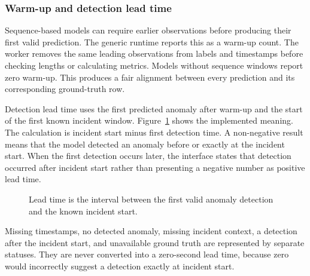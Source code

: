 \subsubsection{Warm-up and detection lead time}

Sequence-based models can require earlier observations before producing their first valid prediction. The generic runtime reports this as a warm-up count. The worker removes the same leading observations from labels and timestamps before checking lengths or calculating metrics. Models without sequence windows report zero warm-up. This produces a fair alignment between every prediction and its corresponding ground-truth row.

Detection lead time uses the first predicted anomaly after warm-up and the start of the first known incident window. Figure~\ref{fig:comparison_lead_time} shows the implemented meaning. The calculation is incident start minus first detection time. A non-negative result means that the model detected an anomaly before or exactly at the incident start. When the first detection occurs later, the interface states that detection occurred after incident start rather than presenting a negative number as positive lead time.

\begin{figure}[H]
    \centering
    \caption{Lead time is the interval between the first valid anomaly detection and the known incident start.}
    \label{fig:comparison_lead_time}
\end{figure}

Missing timestamps, no detected anomaly, missing incident context, a detection after the incident start, and unavailable ground truth are represented by separate statuses. They are never converted into a zero-second lead time, because zero would incorrectly suggest a detection exactly at incident start.

